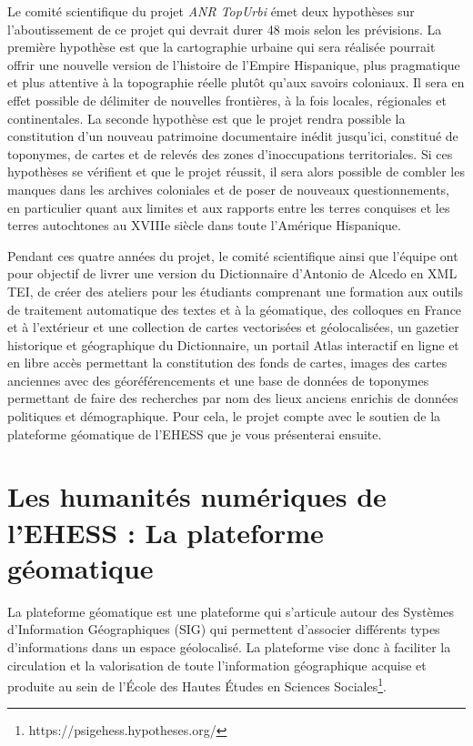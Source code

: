 \documentclass[a4paper,12pt,twoside]{book}
\begin{document}
Le comité scientifique du projet \textit{ANR TopUrbi} émet deux hypothèses sur l’aboutissement de ce projet qui devrait durer 48 mois selon les prévisions. La première hypothèse est que la cartographie urbaine qui sera réalisée pourrait offrir une nouvelle version de l’histoire de l’Empire Hispanique, plus pragmatique et plus attentive à la topographie réelle plutôt qu’aux savoirs coloniaux. Il sera en effet possible de délimiter de nouvelles frontières, à la fois locales, régionales et continentales. La seconde hypothèse est que le projet rendra possible la constitution d’un nouveau patrimoine documentaire inédit jusqu’ici, constitué de toponymes, de cartes et de relevés des zones d’inoccupations territoriales. Si ces hypothèses se vérifient et que le projet réussit, il sera alors possible de combler les manques dans les archives coloniales et de poser de nouveaux questionnements, en particulier quant aux limites et aux rapports entre les terres conquises et les terres autochtones au XVIIIe siècle dans toute l’Amérique Hispanique. 

Pendant ces quatre années du projet, le comité scientifique ainsi que l’équipe ont pour objectif de livrer une version du Dictionnaire d’Antonio de Alcedo en XML TEI, de créer des ateliers pour les étudiants comprenant une formation aux outils de traitement automatique des textes et à la géomatique, des colloques en France et à l’extérieur et une collection de cartes vectorisées et géolocalisées, un gazetier historique et géographique du Dictionnaire, un portail Atlas interactif en ligne et en libre accès permettant la constitution des fonds de cartes, images des cartes anciennes avec des géoréférencements et une base de données de toponymes permettant de faire des recherches par nom des lieux anciens enrichis de données politiques et démographique. Pour cela, le projet compte avec le soutien de la plateforme géomatique de l’EHESS que je vous présenterai ensuite. \\



\section{Les humanités numériques de l’EHESS : La plateforme géomatique} 

La plateforme géomatique est une plateforme qui s’articule autour des Systèmes d’Information Géographiques (SIG) qui permettent d’associer différents types d’informations dans un espace géolocalisé. La plateforme vise donc à faciliter la circulation et la valorisation de toute l’information géographique acquise et produite au sein de l’École des Hautes Études en Sciences Sociales\footnote{https://psigehess.hypotheses.org/}.
	
\end{document}
